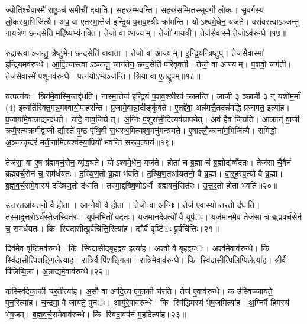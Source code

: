 ज्योति॑श्चै॒वास्मै॑ रा॒ष्ट्रञ्च॑ स॒मीची॑ दधाति। स॒हस्र॑म्भवन्ति। स॒हस्र॑सम्मितस्सुव॒र्गो लो॒कः। सु॒व॒र्गस्य॑ लो॒कस्या॒भिजि॑त्यै। अप॒ वा ए॒तस्मा॒त्तेज॑ इन्द्रि॒यं प॒शव॒श्श्रीः क्रा॑मन्ति। योऽश्वमे॒धेन॒ यज॑ते। वस॑वस्त्वाऽञ्जन्तु गाय॒त्रेण॒ छन्द॒सेति॒ महि॑ष्य॒भ्य॑नक्ति। तेजो॒ वा आज्यम्। तेजो॑ गाय॒त्री। तेज॑सै॒वास्मै॒ तेजोऽव॑रुन्धे॥१७॥

रु॒द्रास्त्वाञ्जन्तु॒ त्रैष्टु॑भेन॒ छन्द॒सेति॑ वा॒वाता। तेजो॒ वा आज्यम्। इ॒न्द्रि॒यन्त्रि॒ष्टुप्। तेज॑सै॒वास्मा॑ इन्द्रि॒यमव॑रुन्धे। आ॒दि॒त्यास्त्वाऽञ्जन्तु॒ जाग॑तेन॒ छन्द॒सेति॑ परिवृ॒क्ती। तेजो॒ वा आज्यम्। प॒शवो॒ जग॑ती। तेज॑सै॒वास्मे॑ प॒शूनव॑रुन्धे। पत्न॑यो॒ऽभ्य॑ञ्जन्ति। श्रि॒या वा ए॒तद्रू॒पम्॥१८॥

यत्पत्न॑यः। श्रिय॑मे॒वास्मि॒न्तद्द॑धति। नास्मा॒त्तेज॑ इन्द्रि॒यं प॒शव॒श्श्रीरप॑ क्रामन्ति। लाजी ३ ञ्छाची ३ न् यशो॑म॒माँ (4) इत्यति॑रिक्त॒मन्न॒मश्वा॑यो॒पाह॑रन्ति। प्र॒जामे॒वान्ना॒दीङ्कु॑र्वते। ए॒तद्दे॑वा॒ अन्न॑मत्तै॒तदन्न॑मद्धि प्रजापत॒ इत्या॑ह। प्र॒जाया॑मे॒वान्नाद्य॑न्दधते। यदि॒ नाव॒जिघ्रेत्। अ॒ग्निः प॒शुरा॑सी॒दित्यव॑घ्रापयेत्। अव॑ है॒व जि॑घ्रति। आक्रान्॑ वा॒जी क्रमै॒रत्य॑क्रमीद्वा॒जी द्यौस्ते॑ पृ॒ष्ठं पृ॑थि॒वी स॒धस्थ॒मित्यश्व॒मनु॑मन्त्रयते। ए॒षाल्लोँ॒काना॑म॒भिजि॑त्यै। समि॑द्धो अ॒ञ्जन्कृद॑रं मती॒नामित्यश्व॑स्या॒प्रियो॑ भवन्ति सरूप॒त्याय॑॥१९॥


तेज॑सा॒ वा ए॒ष ब्र॑ह्मवर्च॒सेन॒ व्यृ॑द्ध्यते। योऽश्वमे॒धेन॒ यज॑ते। होता॑ च ब्र॒ह्मा च॑ ब्र॒ह्मोद्य॑व्वँदतः। तेज॑सा चै॒वैनं॑ ब्रह्मवर्च॒सेन॑ च॒ सम॑र्धयतः। द॒ख्षि॒ण॒तो ब्र॒ह्मा भ॑वति। द॒ख्षि॒ण॒तआ॑यतनो॒ वै ब्र॒ह्मा। बा॒र्॒ह॒स्प॒त्यो वै ब्र॒ह्मा। ब्र॒ह्म॒व॒र्च॒समे॒वास्य॑ दख्षिण॒तो द॑धाति। तस्मा॒द्दख्षि॒णोऽर्धो ब्रह्मवर्च॒सित॑रः। उ॒त्त॒र॒तो होता॑ भवति॥२०॥

उ॒त्त॒र॒तआ॑यतनो॒ वै होता। आ॒ग्ने॒यो वै होता। तेजो॒ वा अ॒ग्निः। तेज॑ ए॒वास्योत्तर॒तो द॑धाति। तस्मा॒दुत्त॒रोऽर्ध॑स्तेज॒स्वित॑रः। यूप॑म॒भितो॑ वदतः। य॒ज॒मा॒न॒दे॒व॒त्यो॑ वै यूप॑ः। यज॑मानमे॒व तेज॑सा च ब्रह्मवर्च॒सेन॑ च॒ सम॑र्धयतः। कि स्वि॑दासीत्पू॒र्वचि॑त्ति॒रित्या॑ह। द्यौर्वै वृष्टि॑ः पू॒र्वचि॑त्तिः॥२१॥

दिव॑मे॒व वृष्टि॒मव॑रुन्धे। कि स्वि॑दासीद्बृ॒हद्वय॒ इत्या॑ह। अश्वो॒ वै बृ॒हद्वय॑ः। अश्व॑मे॒वाव॑रुन्धे। कि स्वि॑दासीत्पिशङ्गि॒लेत्या॑ह। रात्रि॒र्वै पि॑शङ्गि॒ला। रात्रि॑मे॒वाव॑रुन्धे। कि स्वि॑दासीत्पिलिप्पि॒लेत्या॑ह। श्रीर्वै पि॑लिप्पि॒ला। अ॒न्नाद्य॑मे॒वाव॑रुन्धे॥२२॥

कस्स्वि॑देका॒की च॑र॒तीत्या॑ह। अ॒सौ वा आ॑दि॒त्य ए॑का॒की च॑रति। तेज॑ ए॒वाव॑रुन्धे। क उ॑स्विज्जायते॒ पुन॒रित्या॑ह। च॒न्द्रमा॒ वै जा॑यते॒ पुन॑ः। आयु॑रे॒वाव॑रुन्धे। कि स्वि॑द्धि॒मस्य॑ भेष॒जमित्या॑ह। अ॒ग्निर्वै हि॒मस्य॑ भेष॒जम्। ब्र॒ह्म॒व॒र्च॒समेवाव॑रुन्धे। कि स्वि॑दा॒वप॑नं म॒हदित्या॑ह॥२३॥

